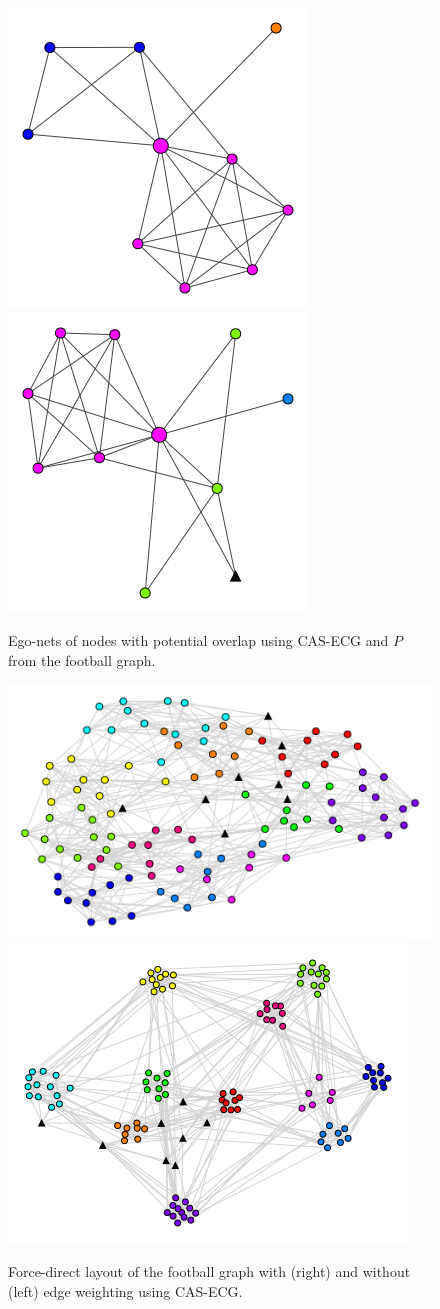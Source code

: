 \documentclass{beamer}
\begin{document}
\begin{frame}{}
    \begin{figure}
        \includegraphics[width=0.49\linewidth]{figures/foot3a.png} \hfill
        \includegraphics[width=0.49\linewidth]{figures/foot3b.png}
        \caption{Ego-nets of nodes with potential overlap using CAS-ECG and $P$ from the football graph.}
    \end{figure}
\end{frame}

\begin{frame}{}
    \begin{figure}
        \includegraphics[width=0.49\linewidth]{figures/foot1a.png} \hfill
        \includegraphics[width=0.49\linewidth]{figures/foot1b.png}
        \vspace{1em}
        \caption{Force-direct layout of the football graph with (right) and without (left) edge weighting using CAS-ECG.}
    \end{figure}
\end{frame}
\end{document}
